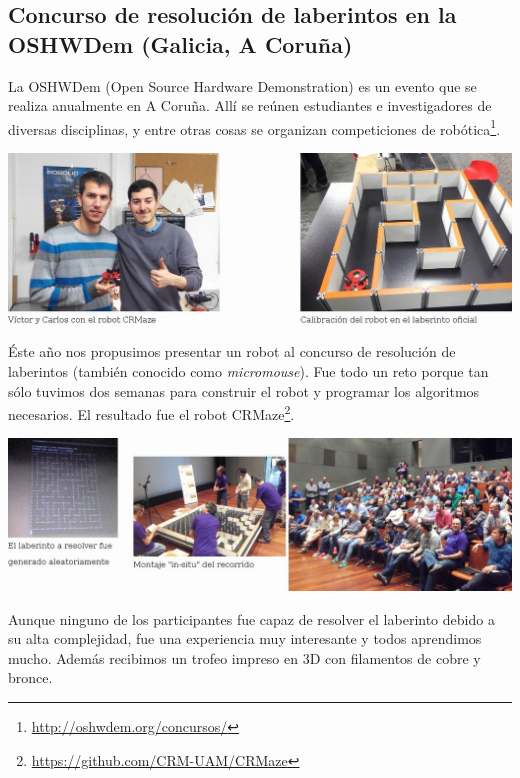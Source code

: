 \documentclass[12pt,twoside]{report}
\begin{document}
\subsection{Concurso de resolución de laberintos en la OSHWDem (Galicia, A Coruña)}

La OSHWDem (Open Source Hardware Demonstration) es un evento que se realiza anualmente en A Coruña. Allí se reúnen estudiantes e investigadores de diversas disciplinas, y entre otras cosas se organizan competiciones de robótica\footnote{\url{http://oshwdem.org/concursos/}}.

\vspace{5mm}

\centerline{\includegraphics[width=1.1\linewidth]{fotos/oshwdem2015_robot}}

Éste año nos propusimos presentar un robot al concurso de resolución de laberintos (también conocido como \emph{micromouse}). Fue todo un reto porque tan sólo tuvimos dos semanas para construir el robot y programar los algoritmos necesarios.
El resultado fue el robot CRMaze\footnote{\url{https://github.com/CRM-UAM/CRMaze}}.


\vspace{5mm}
\centerline{\includegraphics[width=1.1\linewidth]{fotos/oshwdem2015_laberinto}}


Aunque ninguno de los participantes fue capaz de resolver el laberinto debido a su alta complejidad, fue una experiencia muy interesante y todos aprendimos mucho. Además recibimos un trofeo impreso en 3D con filamentos de cobre y bronce.
\end{document}
